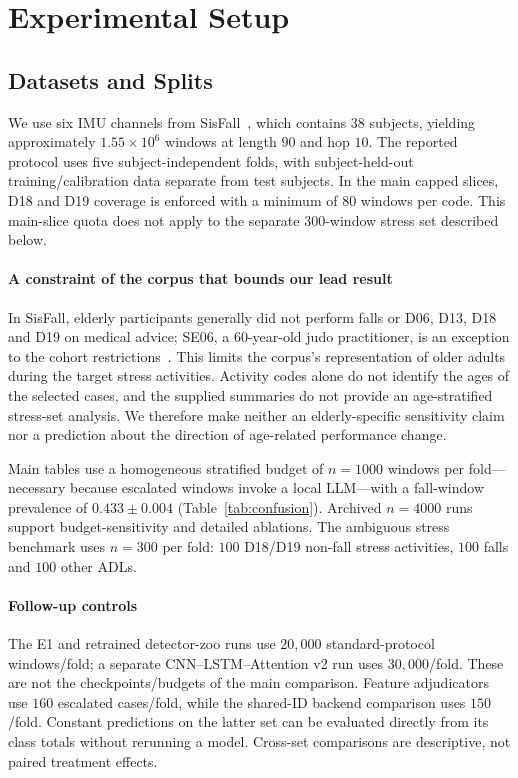 \documentclass[journal]{IEEEtran}
\begin{document}
\section{Experimental Setup}
\label{sec:setup}

\subsection{Datasets and Splits}
We use six IMU channels from SisFall~\cite{sisfall2017}, which contains $38$ subjects, yielding approximately $1.55{\times}10^6$ windows at length $90$ and hop $10$. The reported protocol uses five subject-independent folds, with subject-held-out training/calibration data separate from test subjects. In the main capped slices, D18 and D19 coverage is enforced with a minimum of $80$ windows per code. This main-slice quota does not apply to the separate $300$-window stress set described below.

\paragraph{A constraint of the corpus that bounds our lead result}
In SisFall, elderly participants generally did not perform falls or D06, D13, D18 and D19 on medical advice; SE06, a 60-year-old judo practitioner, is an exception to the cohort restrictions~\cite{sisfall2017}. This limits the corpus's representation of older adults during the target stress activities. Activity codes alone do not identify the ages of the selected cases, and the supplied summaries do not provide an age-stratified stress-set analysis. We therefore make neither an elderly-specific sensitivity claim nor a prediction about the direction of age-related performance change.

Main tables use a homogeneous stratified budget of $n{=}1000$ windows per fold---necessary because escalated windows invoke a local LLM---with a fall-window prevalence of $0.433{\pm}0.004$ (Table~\ref{tab:confusion}). Archived $n{=}4000$ runs support budget-sensitivity and detailed ablations. The ambiguous stress benchmark uses $n{=}300$ per fold: $100$ D18/D19 non-fall stress activities, $100$ falls and $100$ other ADLs.

\paragraph{Follow-up controls}
The E1 and retrained detector-zoo runs use $20{,}000$ standard-protocol windows/fold; a separate CNN--LSTM--Attention v2 run uses $30{,}000$/fold. These are not the checkpoints/budgets of the main comparison. Feature adjudicators use $160$ escalated cases/fold, while the shared-ID backend comparison uses $150$/fold. Constant predictions on the latter set can be evaluated directly from its class totals without rerunning a model. Cross-set comparisons are descriptive, not paired treatment effects.
\end{document}
